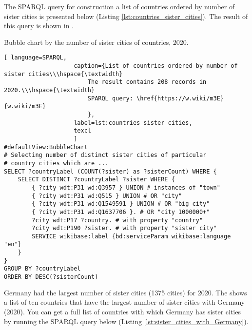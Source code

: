 The SPARQL query for construction a list of countries ordered by number of sister cities is presented below (Listing \ref{lst:countries_sister_cities}). The result of this query is shown in .

\begin{marginfigure}[2cm]
{
\setlength{\fboxsep}{0pt}%
\setlength{\fboxrule}{1pt}%
}
	\caption{Bubble chart by the number of sister cities of countries, 2020.}
\end{marginfigure}

\begin{lstlisting}[ language=SPARQL, 
                    caption={List of countries ordered by number of sister cities\\\hspace{\textwidth}
                        The result contains 208 records in 2020.\\\hspace{\textwidth}
                        SPARQL query: \href{https://w.wiki/m3E}{w.wiki/m3E}
                        },
                    label=lst:countries_sister_cities,
                    texcl 
                    ]
#defaultView:BubbleChart
# Selecting number of distinct sister cities of particular  
# country cities which are ... 
SELECT ?countryLabel (COUNT(?sister) as ?sisterCount) WHERE { 
	SELECT DISTINCT ?countryLabel ?sister WHERE {
		{ ?city wdt:P31 wd:Q3957 } UNION # instances of "town"
		{ ?city wdt:P31 wd:Q515 } UNION # OR "city"
		{ ?city wdt:P31 wd:Q1549591 } UNION # OR "big city"
		{ ?city wdt:P31 wd:Q1637706 }. # OR "city 1000000+"
		?city wdt:P17 ?country. # with property "country"
		?city wdt:P190 ?sister. # with property "sister city"
		SERVICE wikibase:label {bd:serviceParam wikibase:language "en"}
	}                                 
}
GROUP BY ?countryLabel
ORDER BY DESC(?sisterCount)
\end{lstlisting}%

Germany had the largest number of sister cities (1375 cities) for 2020. The  shows a list of ten countries that have the largest number of sister cities with Germany (2020). You can get a full list of countries with which Germany has sister cities by running the SPARQL query below (Listing \ref{lst:sister_cities_with_Germany}).

